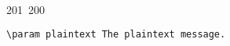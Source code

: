201~200~\documentclass{article}
\begin{document}
\begin{lstlisting}[language=Python, caption=Encrypting a Message with ChaCha20-Poly1305]
	                                                                                                                                                                                                                                                                                                	                                                                                                                                        	    	                                                                                                	                                                                                                                                                                                                                                                                                                                                	                                                                        	                                                                        	                                                                                                                                        	                                                                                                                                                                                                                        	                                                                                                                            	                                                                	                                                                                                                    \param plaintext The plaintext message.

\end{lstlisting}
\end{document}
